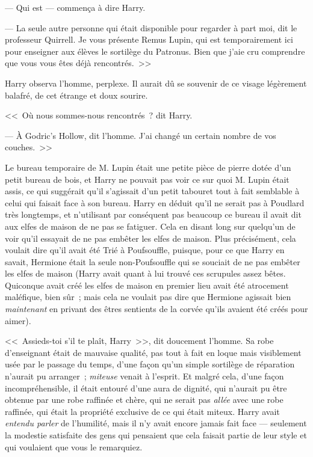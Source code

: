 --- Qui est — commença à dire Harry.

--- La seule autre personne qui était disponible pour regarder à part moi, dit le professeur Quirrell. Je vous présente Remus Lupin, qui est temporairement ici pour enseigner aux élèves le sortilège du Patronus. Bien que j'aie cru comprendre que vous vous êtes déjà rencontrés.~>>

Harry observa l'homme, perplexe. Il aurait dû se souvenir de ce visage légèrement balafré, de cet étrange et doux sourire.

<<~Où nous sommes-nous rencontrés~? dit Harry.

--- À Godric's Hollow, dit l'homme. J'ai changé un certain nombre de vos couches.~>>

\later

Le bureau temporaire de M. Lupin était une petite pièce de pierre dotée d'un petit bureau de bois, et Harry ne pouvait pas voir ce sur quoi M. Lupin était assis, ce qui suggérait qu'il s'agissait d'un petit tabouret tout à fait semblable à celui qui faisait face à son bureau. Harry en déduit qu'il ne serait pas à Poudlard très longtemps, et n'utilisant par conséquent pas beaucoup ce bureau il avait dit aux elfes de maison de ne pas se fatiguer. Cela en disant long sur quelqu'un de voir qu'il essayait de ne pas embêter les elfes de maison. Plus précisément, cela voulait dire qu'il avait été Trié à Poufsouffle, puisque, pour ce que Harry en savait, Hermione était la seule non-Poufsouffle qui se souciait de ne pas embêter les elfes de maison (Harry avait quant à lui trouvé ces scrupules assez bêtes. Quiconque avait créé les elfes de maison en premier lieu avait été atrocement maléfique, bien sûr~; mais cela ne voulait pas dire que Hermione agissait bien \emph{maintenant} en privant des êtres sentients de la corvée qu'ils avaient été créés pour aimer).

<<~Assieds-toi s'il te plaît, Harry~>>, dit doucement l'homme. Sa robe d'enseignant était de mauvaise qualité, pas tout à fait en loque mais visiblement usée par le passage du temps, d'une façon qu'un simple sortilège de réparation n'aurait pu arranger~; \emph{miteuse} venait à l'esprit. Et malgré cela, d'une façon incompréhensible, il était entouré d'une aura de dignité, qui n'aurait pu être obtenue par une robe raffinée et chère, qui ne serait pas \emph{allée} avec une robe raffinée, qui était la propriété exclusive de ce qui était miteux. Harry avait \emph{entendu parler} de l'humilité, mais il n'y avait encore jamais fait face — seulement la modestie satisfaite des gens qui pensaient que cela faisait partie de leur style et qui voulaient que vous le remarquiez.

